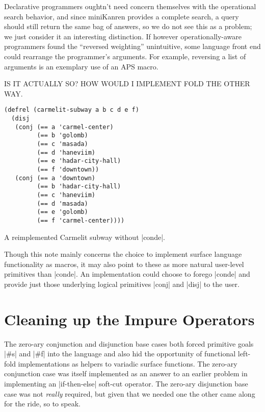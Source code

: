 \documentclass[sigplan,screen,draft,anonymous,review,natbib=false]{acmart}
\begin{document}
Declarative programmers oughtn't need concern themselves with the
operational search behavior, and since miniKanren provides a complete
search, a query should still return the same bag of answers, so we do
not see this as a problem; we just consider it an interesting
distinction. If however operationally-aware programmers found the
\enquote{reversed weighting} unintuitive, some language front end
could rearrange the programmer's arguments. For example, reversing a
list of arguments is an exemplary use of an APS macro.

IS IT ACTUALLY SO? HOW WOULD I IMPLEMENT FOLD THE OTHER WAY.

\begin{listing}
  \begin{verbatim}
(defrel (carmelit-subway a b c d e f)
  (disj
   (conj (== a 'carmel-center)
         (== b 'golomb)
         (== c 'masada)
         (== d 'haneviim)
         (== e 'hadar-city-hall)
         (== f 'downtown))
   (conj (== a 'downtown)
         (== b 'hadar-city-hall)
         (== c 'haneviim)
         (== d 'masada)
         (== e 'golomb)
         (== f 'carmel-center))))
  \end{verbatim}
  \caption{A reimplemented Carmelit subway without \rackinline|conde|.}
  \label{mnt:new-carmelit}
\end{listing}

Though this note mainly concerns the choice to implement surface
language functionality as macros, it may also point to these as more
natural user-level primitives than \rackinline|conde|. An
implementation could choose to forego \rackinline|conde| and provide
just those underlying logical primitives \rackinline|conj| and
\rackinline|disj| to the user.

\section{Cleaning up the Impure Operators}\label{sec:impure}

The zero-ary conjunction and disjunction base cases both forced
primitive goals \rackinline|#s| and \rackinline|#f| into the language
and also hid the opportunity of functional left-fold implementations
as helpers to variadic surface functions. The zero-ary conjunction
case was itself implemented as an answer to an earlier problem in
implementing an \rackinline|if-then-else| soft-cut operator. The
zero-ary disjunction base case was not \emph{really} required, but
given that we needed one the other came along for the ride, so to
speak.
\end{document}
